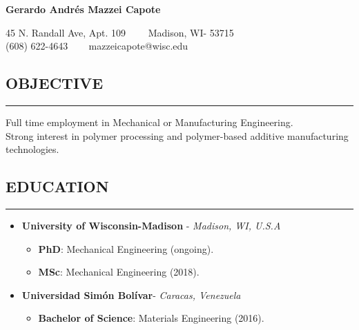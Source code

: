 \documentclass[11pt,letterpaper]{article}
\newenvironment{indentsection}[1]%
{\begin{list}{}%
	{\setlength{\leftmargin}{#1}}%
	\item[]%
}
{\end{list}}
\begin{document}
	\thispagestyle{firststyle}
	
\begin{center}
	{\LARGE \textbf{Gerardo Andrés Mazzei Capote}}

	45 N. Randall Ave, Apt. 109\ \ \textbullet
	\ \ Madison, WI- 53715
	\\
	(608) 622-4643 \ \textbullet
	\ \ mazzeicapote@wisc.edu
\end{center}

\vspace{-1em}

\subsection*{OBJECTIVE}
	\vspace{-0.5em}
	\hrule
	\vspace{0.4em}
	\begin{indentsection}{\parindent}
		Full time employment in Mechanical or Manufacturing Engineering.\\
		Strong interest in polymer processing and polymer-based additive manufacturing technologies.
	\end{indentsection}


\subsection*{EDUCATION}
	\vspace{-0.5em}
	\hrule
	\vspace{0.4em}
	\begin{itemize}
	\item
	\textbf{University of Wisconsin-Madison} - \emph{Madison, WI, U.S.A}
	\begin{itemize}	
	\item
	\textbf{PhD}: Mechanical Engineering (ongoing). 
	\item
	\textbf{MSc}: Mechanical Engineering (2018). 
\end{itemize}

	\item
	\textbf{Universidad Simón Bolívar}- \emph{Caracas, Venezuela}
	\begin{itemize}	
		\item
		\textbf{Bachelor of Science}: Materials Engineering (2016). 
	\end{itemize}
	\end{itemize}
\end{document}
